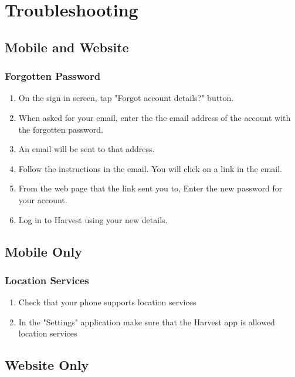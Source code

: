 \documentclass[11pt]{article}
\begin{document}
\newpage
\section{Troubleshooting}

\subsection{Mobile and Website}

\subsubsection{Forgotten Password}
\begin{enumerate}
\item On the sign in screen, tap "Forgot account details?" button.
\item When asked for your email, enter the the email address of the account with the forgotten password.
\item An email will be sent to that address.
\item Follow the instructions in the email. You will click on a link in the email.
\item From the web page that the link sent you to, Enter the new password for your account.
\item Log in to Harvest using your new details.
\end{enumerate}

\subsection{Mobile Only}
\subsubsection{Location Services}
\begin{enumerate}
\item Check that your phone supports location services
\item In the "Settings" application make sure that the Harvest app is allowed location services 
\end{enumerate}

\subsection{Website Only}
\end{document}
